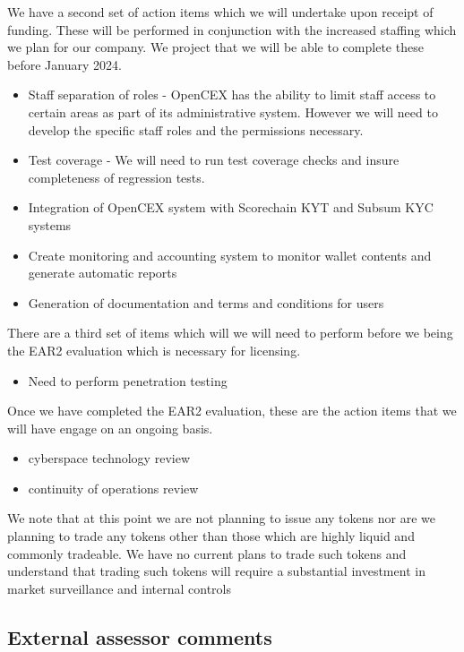 \documentclass[]{report}
\begin{document}
We have a second set of action items which we will undertake upon
receipt of funding.  These will be performed in conjunction with the
increased staffing which we plan for our company.  We project that we
will be able to complete these before January 2024.

\begin{itemize}

\item Staff separation of roles - OpenCEX has the ability to limit
  staff access to certain areas as part of its administrative system.
  However we will need to develop the specific staff roles and the
  permissions necessary.

\item Test coverage - We will need to run test coverage checks and
  insure completeness of regression tests.

\item Integration of OpenCEX system with Scorechain KYT and Subsum KYC
  systems

\item Create monitoring and accounting system to monitor wallet
  contents and generate automatic reports

\item Generation of documentation and terms and conditions for users

\end{itemize}

There are a third set of items which will we will need to perform
before we being the EAR2 evaluation which is necessary for licensing.

\begin{itemize}
\item Need to perform penetration testing
\end{itemize}

Once we have completed the EAR2 evaluation, these are the action items
that we will have engage on an ongoing basis.

\begin{itemize}
\item cyberspace technology review
\item continuity of operations review
\end{itemize}

We note that at this point we are not planning to issue any tokens nor
are we planning to trade any tokens other than those which are highly
liquid and commonly tradeable.  We have no current plans to trade such
tokens and understand that trading such tokens will require a
substantial investment in market surveillance and internal controls

\subsection{External assessor comments}
\end{document}
